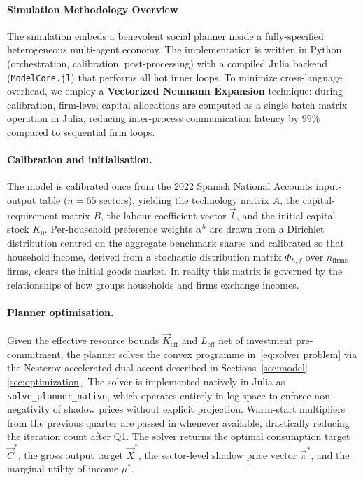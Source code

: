 \paragraph{Simulation Methodology Overview}

The simulation embeds a benevolent social planner inside a fully-specified
heterogeneous multi-agent economy.
The implementation is written in Python (orchestration, calibration,
post-processing) with a compiled Julia backend (\texttt{ModelCore.jl})
that performs all hot inner loops.
To minimize cross-language overhead, we employ a \textbf{Vectorized Neumann Expansion}
technique: during calibration, firm-level capital allocations are computed as a
single batch matrix operation in Julia, reducing inter-process communication
latency by $99\%$ compared to sequential firm loops.

\paragraph{Calibration and initialisation.}
The model is calibrated once from the 2022 Spanish National Accounts
input-output table ($n = 65$ sectors), yielding the technology matrix
$A$, the capital-requirement matrix $B$, the labour-coefficient vector
$\vec{l}$, and the initial capital stock $K_0$.
Per-household preference weights $\alpha^h$ are
drawn from a Dirichlet distribution centred on the aggregate benchmark
shares and calibrated so that household income, derived from a stochastic
distribution matrix $\Phi_{h,f}$ over $n_{\text{firms}}$ firms, clears the
initial goods market. In reality this matrix is governed by the relationships of how groups households and firms exchange incomes.

\paragraph{Planner optimisation.}
Given the effective resource bounds $\vec{K}_{\text{eff}}$ and $L_{\text{eff}}$
net of investment pre-commitment, the planner solves the convex programme
in~\eqref{eq:solver problem} via the Nesterov-accelerated dual ascent
described in Sections~\ref{sec:model}--\ref{sec:optimization}.
The solver is implemented natively in Julia as \texttt{solve\_planner\_native},
which operates entirely in log-space to enforce non-negativity of shadow
prices without explicit projection.
Warm-start multipliers from the previous quarter are passed in whenever
available, drastically reducing the iteration count after Q1.
The solver returns the optimal consumption target $\vec{C}^*$, the gross
output target $\vec{X}^*$, the sector-level shadow price vector $\vec{\pi}^*$,
and the marginal utility of income $\mu^*$.

